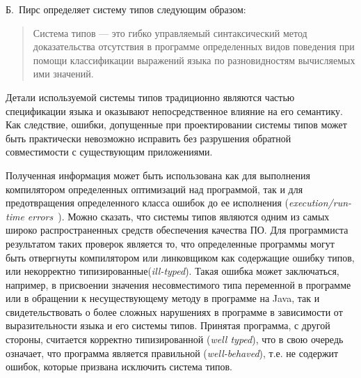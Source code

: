 Б.~Пирс определяет систему типов следующим образом:

\begin{quote}

  Система типов --- это гибко управляемый синтаксический метод доказательства
  отсутствия в программе определенных видов поведения при помощи классификации
  выражений языка по разновидностям вычисляемых ими значений.
\end{quote}


Детали используемой системы типов традиционно являются частью спецификации языка
и оказывают непосредственное влияние на его семантику. Как следствие, ошибки,
допущенные при проектировании системы типов может быть практически невозможно
исправить без разрушения обратной совместимости с существующим приложениями.


Полученная информация может быть использована как для выполнения компилятором
определенных оптимизаций над программой, так и для предотвращения определенного
класса ошибок до ее исполнения (\emph{execution/run-time
  errors}~\cite{Cardelli2004,Pierce2002}). Можно сказать, что системы типов
являются одним из самых широко распространенных средств обеспечения качества ПО.
Для программиста результатом таких проверок является то, что определенные
программы могут быть отвергнуты компилятором или линковщиком как содержащие
ошибку типов, или некорректно типизированные(\emph{ill-typed}).
Такая ошибка может заключаться, например, в присвоении значения несовместимого
типа переменной в программе или в обращении к несуществующему методу в программе
на Java, так и свидетельствовать о более сложных нарушениях в программе в
зависимости от выразительности языка и его системы типов. Принятая 
программа, с другой стороны, считается корректно типизированной (\emph{well
  typed}), что в свою очередь означает, что программа является правильной
(\emph{well-behaved}), т.е. не содержит ошибок, которые призвана исключить
система типов. 

